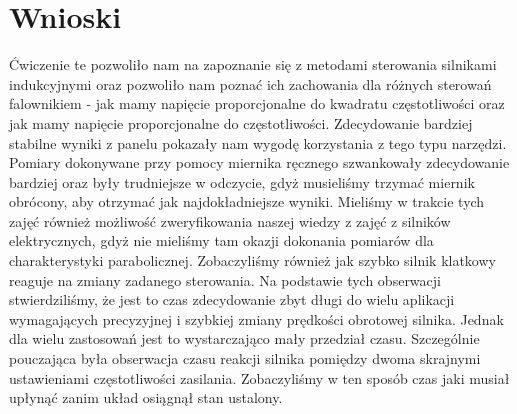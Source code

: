 \documentclass[a4paper, 12pt]{article}
\begin{document}
	\section{Wnioski}
		Ćwiczenie te pozwoliło nam na zapoznanie się z metodami sterowania silnikami indukcyjnymi oraz pozwoliło nam poznać ich zachowania dla różnych sterowań falownikiem - jak mamy napięcie proporcjonalne do kwadratu częstotliwości oraz jak mamy napięcie proporcjonalne do częstotliwości.
		\newline
		\newline
		Zdecydowanie bardziej stabilne wyniki z panelu pokazały nam wygodę korzystania z tego typu narzędzi. Pomiary dokonywane przy pomocy miernika ręcznego szwankowały zdecydowanie bardziej oraz były trudniejsze w odczycie, gdyż musieliśmy trzymać miernik obrócony, aby otrzymać jak najdokładniejsze wyniki.
		\newline 
		\newline
		Mieliśmy w trakcie tych zajęć również możliwość zweryfikowania naszej wiedzy z zajęć z silników elektrycznych, gdyż nie mieliśmy tam okazji dokonania pomiarów dla charakterystyki parabolicznej.
		\newline
		\newline
		Zobaczyliśmy również jak szybko silnik klatkowy reaguje na zmiany zadanego sterowania. Na podstawie tych obserwacji stwierdziliśmy, że jest to czas zdecydowanie zbyt długi do wielu aplikacji wymagających precyzyjnej i szybkiej zmiany prędkości obrotowej silnika. Jednak dla wielu zastosowań jest to wystarczająco mały przedział czasu.
		\newline 
		\newline
		Szczególnie pouczająca była obserwacja czasu reakcji silnika pomiędzy dwoma skrajnymi ustawieniami częstotliwości zasilania. Zobaczyliśmy w ten sposób czas jaki musiał upłynąć zanim układ osiągnął stan ustalony.
\end{document}
